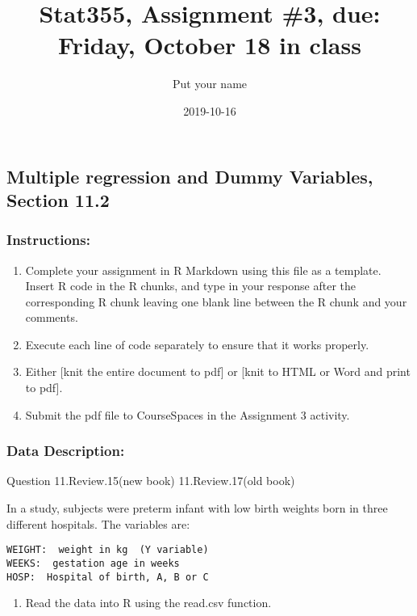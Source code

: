 \documentclass[11pt,]{article}
\title{Stat355, Assignment \#3, due: Friday, October 18 in class}
\author{Put your name}
\date{2019-10-16}
\providecommand{\tightlist}{%
  \setlength{\itemsep}{0pt}\setlength{\parskip}{0pt}}
\begin{document}
\maketitle

\subsection{Multiple regression and Dummy Variables, Section
11.2}\label{multiple-regression-and-dummy-variables-section-11.2}

\subsubsection{Instructions:}\label{instructions}

\begin{enumerate}
\def\labelenumi{\arabic{enumi}.}
\tightlist
\item
  Complete your assignment in R Markdown using this file as a template.
  Insert R code in the R chunks, and type in your response after the
  corresponding R chunk leaving one blank line between the R chunk and
  your comments.
\item
  Execute each line of code separately to ensure that it works properly.
\item
  Either {[}knit the entire document to pdf{]} or {[}knit to HTML or
  Word and print to pdf{]}.
\item
  Submit the pdf file to CourseSpaces in the Assignment 3 activity.
\end{enumerate}

\subsubsection{Data Description:}\label{data-description}

Question 11.Review.15(new book) 11.Review.17(old book)

In a study, subjects were preterm infant with low birth weights born in
three different hospitals. The variables are:

\begin{verbatim}
WEIGHT:  weight in kg  (Y variable)  
WEEKS:  gestation age in weeks  
HOSP:  Hospital of birth, A, B or C  
\end{verbatim}

\begin{enumerate}
\def\labelenumi{\arabic{enumi}.}
\setcounter{enumi}{-1}
\tightlist
\item
  Read the data into R using the read.csv function.
\end{enumerate}
\end{document}
